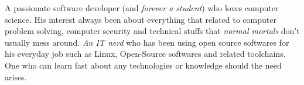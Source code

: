 

\begin{cvparagraph}

A passionate software developer (and \textit{forever a student}) who loves computer science. His interest always been about everything that related to computer problem solving, computer security and technical stuffs that \textit{normal mortals} don't usually mess around. \textit{An IT nerd} who has been using open source softwares for his everyday job such as Linux, Open-Source softwares and related toolchains. One who can learn fast about any technologies or knowledge should the need arises.
\end{cvparagraph}
